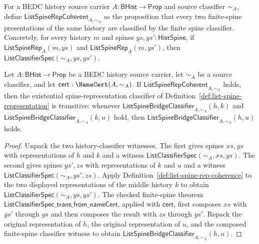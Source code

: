 \begin{definition}
\label{def:list-spine-rep-coherence}
For a BEDC history source carrier $A:\mathsf{BHist}\to\mathsf{Prop}$ and
source classifier $\sim_A$, define
$\mathsf{ListSpineRepCoherent}_{A,\sim_A}$ as the proposition that every two
finite-spine presentations of the same history are classified by the finite
spine classifier. Concretely, for every history $m$ and spines $ys,ys':\mathsf{HistSpine}$,
if $\mathsf{ListSpineRep}_A(m,ys)$ and $\mathsf{ListSpineRep}_A(m,ys')$, then
$\mathsf{ListClassifierSpec}(\sim_A,ys,ys')$.
\end{definition}

\begin{theorem}
\label{thm:list-history-classifier-trans-from-spine-coherence}
Let $A:\mathsf{BHist}\to\mathsf{Prop}$ be a BEDC history source carrier, let $\sim_A$ be a source classifier, and let $\mathsf{cert}:\NameCert(A,\sim_A)$. If $\mathsf{ListSpineRepCoherent}_{A,\sim_A}$ holds, then the existential spine-representation classifier of Definition~\ref{def:list-spine-representation} is transitive: whenever $\mathsf{ListSpineBridgeClassifier}_{A,\sim_A}(h,k)$ and $\mathsf{ListSpineBridgeClassifier}_{A,\sim_A}(k,u)$ hold, then $\mathsf{ListSpineBridgeClassifier}_{A,\sim_A}(h,u)$ holds.
\end{theorem}
\begin{proof}
Unpack the two history-classifier witnesses. The first gives spines $xs,ys$ with representations of $h$ and $k$ and a witness $\mathsf{ListClassifierSpec}(\sim_A,xs,ys)$. The second gives spines $ys',zs$ with representations of $k$ and $u$ and a witness $\mathsf{ListClassifierSpec}(\sim_A,ys',zs)$. Apply Definition~\ref{def:list-spine-rep-coherence} to the two displayed representations of the middle history $k$ to obtain $\mathsf{ListClassifierSpec}(\sim_A,ys,ys')$. The checked finite-spine theorem $\mathsf{ListClassifierSpec\_trans\_from\_nameCert}$, applied with $\mathsf{cert}$, first composes $xs$ with $ys'$ through $ys$ and then composes the result with $zs$ through $ys'$. Repack the original representation of $h$, the original representation of $u$, and the composed finite-spine classifier witness to obtain $\mathsf{ListSpineBridgeClassifier}_{A,\sim_A}(h,u)$.
\end{proof}

